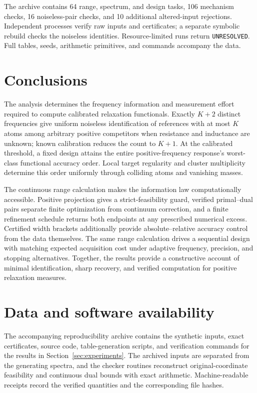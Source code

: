 \documentclass[10pt]{amsart}
\theoremstyle{definition}
\theoremstyle{remark}
\begin{document}
The archive contains 64 range, spectrum, and design tasks, 106 mechanism checks, 16 noiseless-pair checks, and 10 additional altered-input rejections. Independent processes verify raw inputs and certificates; a separate symbolic rebuild checks the noiseless identities. Resource-limited runs return \texttt{UNRESOLVED}. Full tables, seeds, arithmetic primitives, and commands accompany the data.

\section{Conclusions}
The analysis determines the frequency information and measurement effort required to compute calibrated relaxation functionals. Exactly $K+2$ distinct frequencies give uniform noiseless identification of references with at most $K$ atoms among arbitrary positive competitors when resistance and inductance are unknown; known calibration reduces the count to $K+1$. At the calibrated threshold, a fixed design attains the entire positive-frequency response's worst-class functional accuracy order. Local target regularity and cluster multiplicity determine this order uniformly through colliding atoms and vanishing masses.

The continuous range calculation makes the information law computationally accessible. Positive projection gives a strict-feasibility guard, verified primal--dual pairs separate finite optimization from continuum correction, and a finite refinement schedule returns both endpoints at any prescribed numerical excess. Certified width brackets additionally provide absolute--relative accuracy control from the data themselves. The same range calculation drives a sequential design with matching expected acquisition cost under adaptive frequency, precision, and stopping alternatives. Together, the results provide a constructive account of minimal identification, sharp recovery, and verified computation for positive relaxation measures.

\section*{Data and software availability}
The accompanying reproducibility archive contains the synthetic inputs, exact certificates, source code, table-generation scripts, and verification commands for the results in Section~\ref{sec:experiments}. The archived inputs are separated from the generating spectra, and the checker routines reconstruct original-coordinate feasibility and continuous dual bounds with exact arithmetic. Machine-readable receipts record the verified quantities and the corresponding file hashes.
\end{document}
